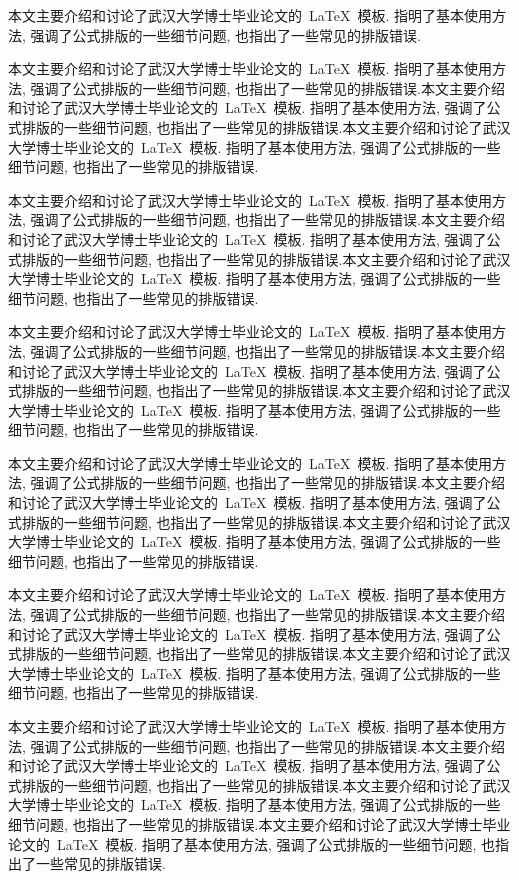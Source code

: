 \begin{enabstract}
本文主要介绍和讨论了武汉大学博士毕业论文的~\LaTeX~模板.
指明了基本使用方法, 强调了公式排版的一些细节问题, 也指出了一些常见的排版错误.


本文主要介绍和讨论了武汉大学博士毕业论文的~\LaTeX~模板.
指明了基本使用方法, 强调了公式排版的一些细节问题, 也指出了一些常见的排版错误.本文主要介绍和讨论了武汉大学博士毕业论文的~\LaTeX~模板.
指明了基本使用方法, 强调了公式排版的一些细节问题, 也指出了一些常见的排版错误.本文主要介绍和讨论了武汉大学博士毕业论文的~\LaTeX~模板.
指明了基本使用方法, 强调了公式排版的一些细节问题, 也指出了一些常见的排版错误.


本文主要介绍和讨论了武汉大学博士毕业论文的~\LaTeX~模板.
指明了基本使用方法, 强调了公式排版的一些细节问题, 也指出了一些常见的排版错误.本文主要介绍和讨论了武汉大学博士毕业论文的~\LaTeX~模板.
指明了基本使用方法, 强调了公式排版的一些细节问题, 也指出了一些常见的排版错误.本文主要介绍和讨论了武汉大学博士毕业论文的~\LaTeX~模板.
指明了基本使用方法, 强调了公式排版的一些细节问题, 也指出了一些常见的排版错误.


本文主要介绍和讨论了武汉大学博士毕业论文的~\LaTeX~模板.
指明了基本使用方法, 强调了公式排版的一些细节问题, 也指出了一些常见的排版错误.本文主要介绍和讨论了武汉大学博士毕业论文的~\LaTeX~模板.
指明了基本使用方法, 强调了公式排版的一些细节问题, 也指出了一些常见的排版错误.本文主要介绍和讨论了武汉大学博士毕业论文的~\LaTeX~模板.
指明了基本使用方法, 强调了公式排版的一些细节问题, 也指出了一些常见的排版错误.


本文主要介绍和讨论了武汉大学博士毕业论文的~\LaTeX~模板.
指明了基本使用方法, 强调了公式排版的一些细节问题, 也指出了一些常见的排版错误.本文主要介绍和讨论了武汉大学博士毕业论文的~\LaTeX~模板.
指明了基本使用方法, 强调了公式排版的一些细节问题, 也指出了一些常见的排版错误.本文主要介绍和讨论了武汉大学博士毕业论文的~\LaTeX~模板.
指明了基本使用方法, 强调了公式排版的一些细节问题, 也指出了一些常见的排版错误.


本文主要介绍和讨论了武汉大学博士毕业论文的~\LaTeX~模板.
指明了基本使用方法, 强调了公式排版的一些细节问题, 也指出了一些常见的排版错误.本文主要介绍和讨论了武汉大学博士毕业论文的~\LaTeX~模板.
指明了基本使用方法, 强调了公式排版的一些细节问题, 也指出了一些常见的排版错误.本文主要介绍和讨论了武汉大学博士毕业论文的~\LaTeX~模板.
指明了基本使用方法, 强调了公式排版的一些细节问题, 也指出了一些常见的排版错误.



本文主要介绍和讨论了武汉大学博士毕业论文的~\LaTeX~模板.
指明了基本使用方法, 强调了公式排版的一些细节问题, 也指出了一些常见的排版错误.本文主要介绍和讨论了武汉大学博士毕业论文的~\LaTeX~模板.
指明了基本使用方法, 强调了公式排版的一些细节问题, 也指出了一些常见的排版错误.本文主要介绍和讨论了武汉大学博士毕业论文的~\LaTeX~模板.
指明了基本使用方法, 强调了公式排版的一些细节问题, 也指出了一些常见的排版错误.本文主要介绍和讨论了武汉大学博士毕业论文的~\LaTeX~模板.
指明了基本使用方法, 强调了公式排版的一些细节问题, 也指出了一些常见的排版错误.





\end{enabstract}
\vspace{1em}\par\vfill

\enkeywords{\LaTeX{}, \dots}


